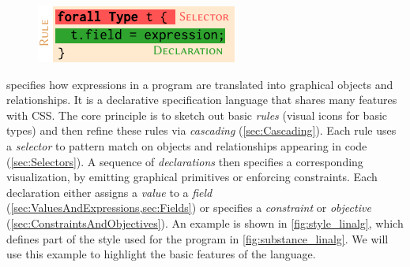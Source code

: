 \setlength{\columnsep}{1em}
\setlength{\intextsep}{1em}
\begin{figure}
   \includegraphics[width=\linewidth]{assets/penrose/StyleNomenclature.pdf}
\end{figure}
\Style{} specifies how expressions in a \Substance{} program are translated into graphical objects and relationships.  It is a declarative specification language that shares many features with CSS.  The core principle is to sketch out basic \emph{rules} (\eg visual icons for basic types) and then refine these rules via \emph{cascading} (\cref{sec:Cascading}).  Each rule uses a \emph{selector} to pattern match on objects and relationships appearing in \Substance{} code (\cref{sec:Selectors}).  A sequence of \emph{declarations} then specifies a corresponding visualization, \eg by emitting graphical primitives or enforcing constraints.  Each declaration either assigns a \emph{value} to a \emph{field} (\cref{sec:ValuesAndExpressions,sec:Fields}) or specifies a \emph{constraint} or \emph{objective} (\cref{sec:ConstraintsAndObjectives}).  An example is shown in \cref{fig:style_linalg}, which defines part of the style used for the \Substance{} program in \cref{fig:substance_linalg}.  We will use this example to highlight the basic features of the language.  

